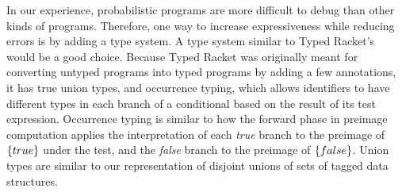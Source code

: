 \begin{comment}
Besides adding direct support for distributions traditionally used in Bayesian modeling such as the gamma distribution, we would like to directly support so-called nonparametric modeling.
The motivation behind nonparametric theories is extremely flexible inference.
Their common feature is selecting among infinitely many theories; for example, fitting a polynomial of any degree or even a general $\Re \to \Re$ function to observed data.
Their prior distributions are typically infinite-dimensional, meaning that
\begin{itemize}
	\item They are developed by people who know measure theory because they have no density models.
	\item 
\end{itemize}

many can be written as recursive programs that produce lazy lists; e.g. the Chinese Restaurant process

flexible priors

parameterizing 

Dirichlet, Gaussian

Brownian motion and other time-series

direct support for functions with infinite domains (e.g. $\Nat$, $\Rat$ or $\Re$)

XXX: by measurability theorem, classical nondeterminism with at most countably many choices is compatible with probabilistic theories

\end{comment}

In our experience, probabilistic programs are more difficult to debug than other kinds of programs.
Therefore, one way to increase expressiveness while reducing errors is by adding a type system.
A type system similar to Typed Racket's~\cite{cit:tobin-hochstadt-2008popl-typed-scheme} would be a good choice.
Because Typed Racket was originally meant for converting untyped programs into typed programs by adding a few annotations, it has true union types, and occurrence typing, which allows identifiers to have different types in each branch of a conditional based on the result of its test expression.
Occurrence typing is similar to how the forward phase in preimage computation applies the interpretation of each \emph{true} branch to the preimage of $\{{true}\}$ under the test, and the \emph{false} branch to the preimage of $\{{false}\}$.
Union types are similar to our representation of disjoint unions of sets of tagged data structures.

